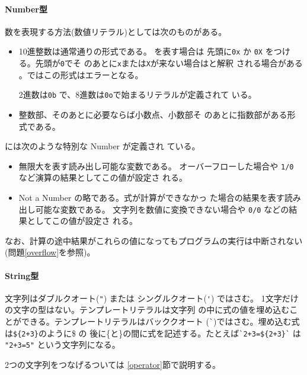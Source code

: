 \paragraph{Number型}
数を表現する方法(数値リテラル)としては次のものがある。
\begin{itemize}
 \item{\bfseries {}} 10進整数は通常通りの形式である。
      を表す場合は
	      先頭に\Verb+0x+ か \Verb+0X+ をつける。先頭が\Verb+0+でそ
	      のあとに\Verb+x+または\Verb+X+が来ない場合はと解釈
      される場合がある
      。\Strict ではこの形式はエラーとなる。

      2進数は\Verb+0b+ で、8進数は\Verb+0o+で始まるリテラルが定義されて
      いる。
 \item{\bfseries {}} 整数部、そのあとに必要ならば小数点、小数部そ
       のあとに指数部がある形式である。
\end{itemize}
には次のような特別な Number が定義され
ている。
\begin{itemize}
 \item {\bfseries {}}無限大を表す読み出し可能な変数である。
       オーバーフローした場合や \Verb+1/0+ など演算の結果としてこの値が設定さ
       れる。
 \item {\bfseries {}} Not a Number の略である。式が計算ができなかっ
       た場合の結果を表す読み出し可能な変数である。
       文字列を数値に変換できない場合や \Verb+0/0+ などの結果としてこの値が設定さ
       れる。
\end{itemize}
なお、計算の途中結果がこれらの値になってもプログラムの実行は中断されない
(問題\ref{overflow}を参照)。\vspace{-1.3\baselineskip}
\paragraph{String型}
文字列はダブルクオート(\Verb+"+) または シングルクオート(\Verb+'+) ではさむ。%
1文字だけの文字の型はない。テンプレートリテラルは文字列
の中に式の値を埋め込むことができる。テンプレートリテラルはバッククオート
(\Verb+`+)ではさむ。埋め込む式は\texttt{\$\{2+3\}}のように\$ の
後に\{と\}の間に式を記述する。たとえば\Verb-`2+3=${2+3}`- は \Verb-"2+3=5"- という文字列になる。%

2つの文字列をつなげる\ElmJ{+}ついては
\ref{operator}節で説明する。

